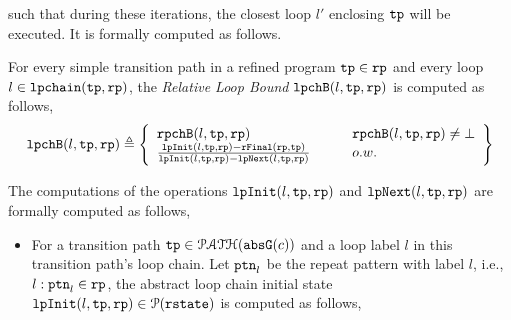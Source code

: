 \begin{enumerate}
\begin{enumerate}
such that during these iterations, the closest loop $l'$ enclosing $\mathtt{tp}$ will be executed.
It is formally computed as follows.
\begin{defn}
  \label{def:relatedloop_bound}
For every simple transition path in a refined program $\mathtt{tp} \in \mathtt{rp}$
and every loop $l \in \mathtt{lpchain}(\mathtt{tp}, \mathtt{rp})$,
the \emph{Relative Loop Bound} $\mathtt{lpchB}(l, \mathtt{tp}, \mathtt{rp})$ is computed as follows,
\[
  \lpchB(l, \tpath, \rprog) \triangleq
  \left\{
  \begin{array}{ll}
    \rpchB(l, \tpath, \rprog)  
    & \qquad \rpchB(l, \tpath, \rprog) \neq \bot
    \\
    \frac{\lpinit(l, \tpath, \rprog) - \rffinal(\rprog, \tpath)}{\lpinit(l, \tpath, \rprog) - \lpnext(l, \tpath, \rprog)}
    & \qquad o.w.
  \end{array}
  \right\}
  \]
\end{defn}
The computations of the operations $\mathtt{lpInit}(l, \mathtt{tp}, \mathtt{rp})$ and $\mathtt{lpNext}(l, \mathtt{tp}, \mathtt{rp})$
are formally computed as follows,
\begin{itemize}
\item For a transition path $\mathtt{tp} \in \mathcal{PATH}(\mathtt{abs}{\mathtt{G}}(c))$ and a loop label $l$ in this transition path's loop chain.
Let $\mathtt{ptn}_l$ be the repeat pattern with label $l$, i.e., $l: \mathtt{ptn}_l \in \mathtt{rp}$, 
the abstract loop chain initial state $\mathtt{lpInit}(l, \mathtt{tp}, \mathtt{rp}) \in \mathcal{P}(\mathtt{rstate})$ is computed as follows,

\end{itemize}
\end{enumerate}
\end{enumerate}
